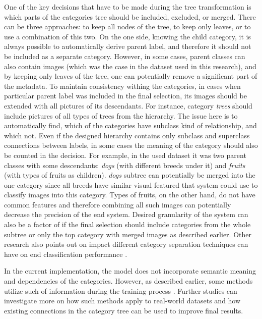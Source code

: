 One of the key decisions that have to be made during the tree transformation is which parts of the categories tree should be included, excluded, or merged. There can be three approaches: to keep all nodes of the tree, to keep only leaves, or to use a combination of this two. On the one side, knowing the child category, it is always possible to automatically derive parent label, and therefore it should not be included as a separate category. However, in some cases, parent classes can also contain images (which was the case in the dataset used in this research), and by keeping only leaves of the tree, one can potentially remove a significant part of the metadata. To maintain consistency withing the categories, in cases when particular parent label was included in the final selection, its images should be extended with all pictures of its descendants. For instance, category \textit{trees} should include pictures of all types of trees from the hierarchy. The issue here is to automatically find, which of the categories have subclass kind of relationship, and which not. Even if the designed hierarchy contains only subclass and superclass connections between labels, in some cases the meaning of the category should also be counted in the decision. For example, in the used dataset it was two parent classes with some descendants: \textit{dogs} (with different breeds under it) and \textit{fruits} (with types of fruits as children). \textit{dogs} subtree can potentially be merged into the one category since all breeds have similar visual featured that system could use to classify images into this category. Types of fruits, on the other hand, do not have common features and therefore combining all such images can potentially decrease the precision of the end system. Desired granularity of the system can also be a factor of if the final selection should include categories from the whole subtree or only the top category with merged images as described earlier. Other research also points out on impact different category separation techniques can have on end classification performance \cite{Dong2013Subcategory-AwareClassification}.

In the current implementation, the model does not incorporate semantic meaning and dependencies of the categories. However, as described earlier, some methods utilize such of information during the training process \cite{Wang2016CNN-RNN:Classification}. Further studies can investigate more on how such methods apply to real-world datasets and how existing connections in the category tree can be used to improve final results.

